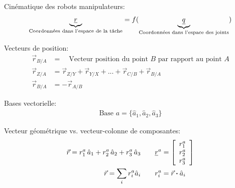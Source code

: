Cinématique des robots manipulateurs:
\begin{align}
\underbrace{
\underline{r} 
}_{\text{Coordonnées dans l'espace de la tâche}}
= f( 
\underbrace{
\underline{q} 
}_{\text{Coordonnées dans l'espace des joints}}
) 
\end{align} 

Vecteurs de position:
\begin{align}
\vec{r}_{B/A}  &=  \quad \text{Vecteur position du point $B$ par rapport au point $A$} \\
\vec{r}_{Z/A}  &=   \vec{r}_{Z/Y} + \vec{r}_{Y/X} + ... + \vec{r}_{C/B} + \vec{r}_{B/A}  \\
\vec{r}_{B/A}  &= - \vec{r}_{A/B}
\end{align} 

Bases vectorielle:
\begin{align}
\text{Base } a = \{ \hat{a}_{1} , \hat{a}_{2} , \hat{a}_{3} \}
\end{align} 

Vecteur géométrique vs. vecteur-colonne de composantes:
\begin{align}
\vec{r} = r_1^a \, \hat{a}_{1} + r_2^a \, \hat{a}_{2} + r_3^a \, \hat{a}_{3}
\quad & \quad
\underline{r}^{a} = \left[ \begin{array}{c} r_1^a \\ r_2^a \\ r_3^a  \end{array} \right]  \\
\vec{r} = \sum_{i} r_i^a \hat{a}_i 
\quad & \quad
r_i^a = \vec{r} \boldsymbol{\cdot} \hat{a}_i
\end{align} 

